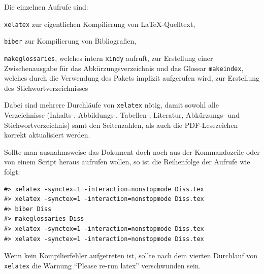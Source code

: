 Die einzelnen Aufrufe sind:
\begin{itemize*}
\item {}\texttt{xelatex} zur eigentlichen Kompilierung von \LaTeX-Quelltext,
\item {}\texttt{biber} zur Kompilierung von Bibliografien,
\item {}\texttt{makeglossaries}, welches intern \texttt{xindy} aufruft,
zur Erstellung einer Zwischenausgabe für das Abkürzungsverzeichnis und das Glossar
\texttt{makeindex}, welches durch die Verwendung des Pakets  implizit aufgerufen wird, zur Erstellung des Stichwortverzeichnisses
\end{itemize*}
Dabei sind mehrere Durchläufe von \texttt{xelatex} nötig,
damit sowohl alle Verzeichnisse
(Inhalts-, Abbildungs-, Tabellen-, Literatur, Abkürzungs- und Stichwortverzeichnis)
samt den Seitenzahlen, als auch die PDF-Lesezeichen korrekt aktualisiert werden.

Sollte man ausnahmsweise das Dokument doch noch aus der Kommandozeile oder von einem Script heraus aufrufen wollen,
so ist die Reihenfolge der Aufrufe wie folgt:
\begin{verbatim}
#> xelatex -synctex=1 -interaction=nonstopmode Diss.tex
#> xelatex -synctex=1 -interaction=nonstopmode Diss.tex
#> biber Diss
#> makeglossaries Diss
#> xelatex -synctex=1 -interaction=nonstopmode Diss.tex
#> xelatex -synctex=1 -interaction=nonstopmode Diss.tex
\end{verbatim}

Wenn kein Kompilierfehler aufgetreten ist,
sollte nach dem vierten Durchlauf von \texttt{xelatex} die
Warnung \enquote{Please re-run latex}
verschwunden sein.